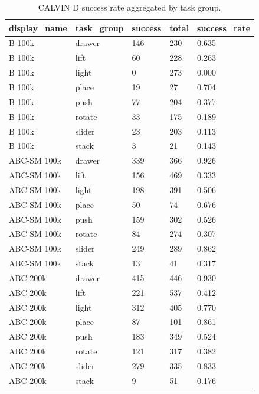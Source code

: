 \begin{table}[t]
\centering
\caption{CALVIN D success rate aggregated by task group.}
\label{tab:task3-task-group-success}
\begin{tabular}{lllll}
\toprule
display\_name & task\_group & success & total & success\_rate \\
\midrule
B 100k & drawer & 146 & 230 & 0.635 \\
B 100k & lift & 60 & 228 & 0.263 \\
B 100k & light & 0 & 273 & 0.000 \\
B 100k & place & 19 & 27 & 0.704 \\
B 100k & push & 77 & 204 & 0.377 \\
B 100k & rotate & 33 & 175 & 0.189 \\
B 100k & slider & 23 & 203 & 0.113 \\
B 100k & stack & 3 & 21 & 0.143 \\
ABC-SM 100k & drawer & 339 & 366 & 0.926 \\
ABC-SM 100k & lift & 156 & 469 & 0.333 \\
ABC-SM 100k & light & 198 & 391 & 0.506 \\
ABC-SM 100k & place & 50 & 74 & 0.676 \\
ABC-SM 100k & push & 159 & 302 & 0.526 \\
ABC-SM 100k & rotate & 84 & 274 & 0.307 \\
ABC-SM 100k & slider & 249 & 289 & 0.862 \\
ABC-SM 100k & stack & 13 & 41 & 0.317 \\
ABC 200k & drawer & 415 & 446 & 0.930 \\
ABC 200k & lift & 221 & 537 & 0.412 \\
ABC 200k & light & 312 & 405 & 0.770 \\
ABC 200k & place & 87 & 101 & 0.861 \\
ABC 200k & push & 183 & 349 & 0.524 \\
ABC 200k & rotate & 121 & 317 & 0.382 \\
ABC 200k & slider & 279 & 335 & 0.833 \\
ABC 200k & stack & 9 & 51 & 0.176 \\
\bottomrule
\end{tabular}
\end{table}
